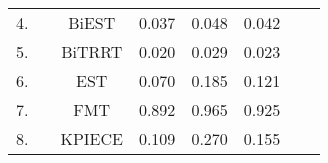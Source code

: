 \begin{table}[H]
\begin{tabular}{|c|c|c|c|c|c|ll}
\cellcolor[HTML]{9AFF99}4.   &                                                                                                                                & \cellcolor[HTML]{9AFF99}BiEST       & \cellcolor[HTML]{9AFF99}0.037                                                                  & \cellcolor[HTML]{9AFF99}0.048                                                                  & \cellcolor[HTML]{9AFF99}0.042                                                                  &  &  \\ \cline{1-1} \cline{3-6}
\cellcolor[HTML]{9AFF99}5.   &                                                                                                                                & \cellcolor[HTML]{9AFF99}BiTRRT      & \cellcolor[HTML]{9AFF99}0.020                                                                  & \cellcolor[HTML]{9AFF99}0.029                                                                  & \cellcolor[HTML]{9AFF99}0.023                                                                  &  &  \\ \cline{1-1} \cline{3-6}
\cellcolor[HTML]{C0C0C0}6.   &                                                                                                                                & \cellcolor[HTML]{C0C0C0}EST         & \cellcolor[HTML]{C0C0C0}0.070                                                                  & \cellcolor[HTML]{C0C0C0}0.185                                                                  & \cellcolor[HTML]{C0C0C0}0.121                                                                  &  &  \\ \cline{1-1} \cline{3-6}
\cellcolor[HTML]{EFEFEF}7.   &                                                                                                                                & \cellcolor[HTML]{EFEFEF}FMT         & \cellcolor[HTML]{EFEFEF}0.892                                                                  & \cellcolor[HTML]{EFEFEF}0.965                                                                  & \cellcolor[HTML]{EFEFEF}0.925                                                                  &  &  \\ \cline{1-1} \cline{3-6}
\cellcolor[HTML]{C0C0C0}8.   &                                                                                                                                & \cellcolor[HTML]{C0C0C0}KPIECE      & \cellcolor[HTML]{C0C0C0}0.109                                                                  & \cellcolor[HTML]{C0C0C0}0.270                                                                  & \cellcolor[HTML]{C0C0C0}0.155                                                                  &  &  \\ \cline{1-1} \cline{3-6}

\end{tabular}
\end{table}
